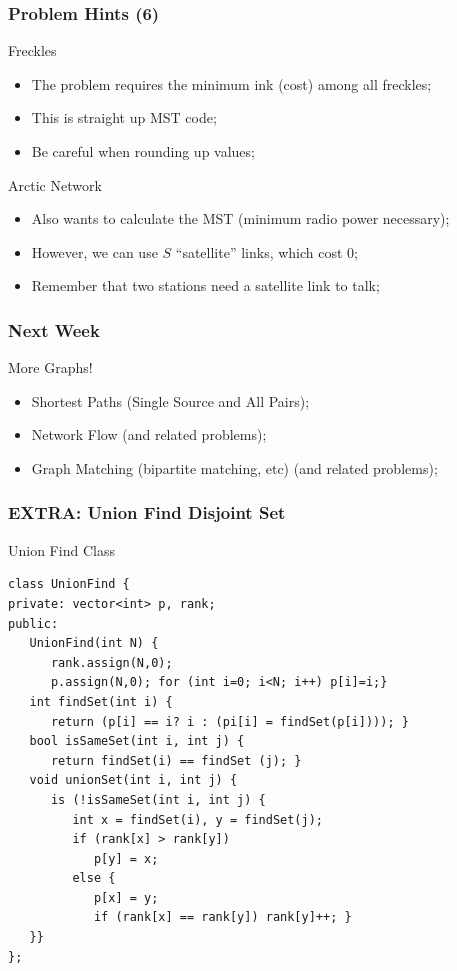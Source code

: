 \documentclass{beamer}
\begin{document}
\begin{frame}
  \frametitle{Problem Hints (6)}
  \begin{block}{Freckles}
    \begin{itemize}
    \item The problem requires the minimum ink (cost) among all freckles;
    \item This is straight up MST code;
    \item Be careful when rounding up values;
    \end{itemize}    
  \end{block}
  \begin{block}{Arctic Network}
    \begin{itemize}
    \item Also wants to calculate the MST (minimum radio power necessary);
    \item However, we can use $S$ ``satellite'' links, which cost 0;
    \item Remember that two stations need a satellite link to talk;
    \end{itemize}
  \end{block}
\end{frame}


\begin{frame}
  \frametitle{Next Week}
  More Graphs!
  \begin{itemize}
  \item Shortest Paths (Single Source and All Pairs);
  \item Network Flow (and related problems);
  \item Graph Matching (bipartite matching, etc) (and related problems);
  \end{itemize}
\end{frame}

\begin{frame}
  \frametitle{EXTRA: Union Find Disjoint Set}
  
  {\tiny
    \begin{exampleblock}{Union Find Class}
\begin{verbatim}
class UnionFind {
private: vector<int> p, rank;
public: 
   UnionFind(int N) {
      rank.assign(N,0);
      p.assign(N,0); for (int i=0; i<N; i++) p[i]=i;}
   int findSet(int i) {
      return (p[i] == i? i : (pi[i] = findSet(p[i]))); }
   bool isSameSet(int i, int j) { 
      return findSet(i) == findSet (j); }
   void unionSet(int i, int j) {
      is (!isSameSet(int i, int j) { 
         int x = findSet(i), y = findSet(j);
         if (rank[x] > rank[y]) 
            p[y] = x;
         else { 
            p[x] = y;
            if (rank[x] == rank[y]) rank[y]++; }
   }}
};
\end{verbatim}
    \end{exampleblock}
  }
\end{frame}

\end{document}
